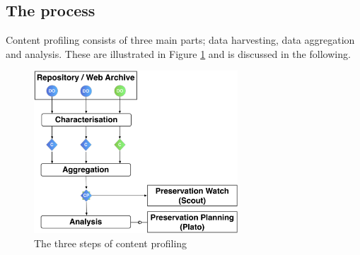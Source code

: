 
\subsection{The process}
Content profiling consists of three main parts; data harvesting, data aggregation and analysis. These are illustrated in Figure \ref{fig:cp_threesteps} and is discussed in the following.

\begin{figure}[bh]
\begin{center}
\includegraphics[width=3in]{figures/contentprofiling/contentprofiling.png}
\caption{The three steps of content profiling}
\label{fig:cp_threesteps}
\end{center}
\end{figure}

